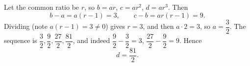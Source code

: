 Let the common ratio be $r$, so $b=ar$, $c=ar^2$, $d=ar^3$. Then
\[
b-a=a(r-1)=3,\qquad c-b=ar(r-1)=9 .
\]
Dividing (note $a(r-1)=3\ne0$) gives $r=3$, and then $a\cdot2=3$, so $a=\dfrac{3}{2}$. The sequence is $\dfrac{3}{2},\dfrac{9}{2},\dfrac{27}{2},\dfrac{81}{2}$, and indeed $\dfrac{9}{2}-\dfrac{3}{2}=3$, $\dfrac{27}{2}-\dfrac{9}{2}=9$. Hence
\[
d=\boxed{\dfrac{81}{2}} .
\]
